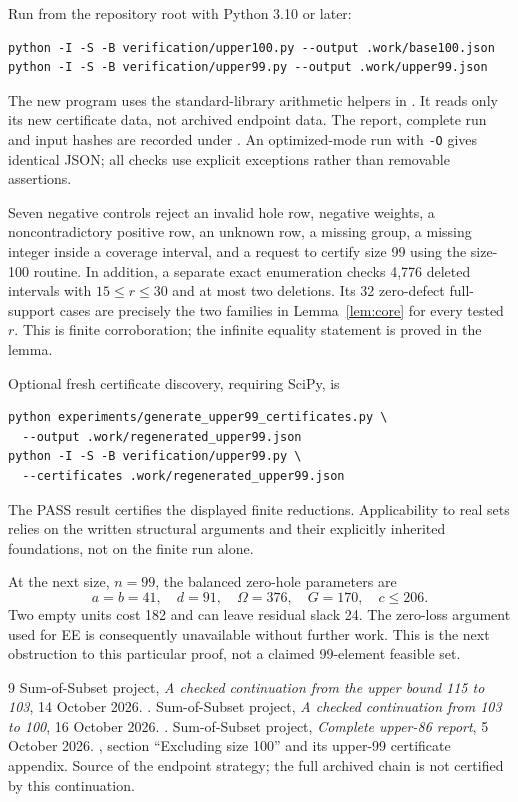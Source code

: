 \documentclass[11pt,a4paper]{article}
\begin{document}
Run from the repository root with Python 3.10 or later:
\begin{verbatim}
python -I -S -B verification/upper100.py --output .work/base100.json
python -I -S -B verification/upper99.py --output .work/upper99.json
\end{verbatim}
The new program uses the standard-library arithmetic helpers in
. It reads only its new certificate data,
not archived endpoint data. The report, complete run and input hashes
are recorded under .
An optimized-mode run with \texttt{-O} gives identical JSON; all checks
use explicit exceptions rather than removable assertions.

Seven negative controls reject an invalid hole row, negative weights,
a noncontradictory positive row, an unknown row, a missing group, a missing
integer inside a coverage interval, and a request to certify size 99
using the size-100 routine. In addition, a separate exact enumeration
checks 4,776 deleted intervals with $15\le r\le30$ and at most two
deletions. Its 32 zero-defect full-support cases are precisely the two
families in Lemma~\ref{lem:core} for every tested $r$. This is finite
corroboration; the infinite equality statement is proved in the lemma.

Optional fresh certificate discovery, requiring SciPy, is
\begin{verbatim}
python experiments/generate_upper99_certificates.py \
  --output .work/regenerated_upper99.json
python -I -S -B verification/upper99.py \
  --certificates .work/regenerated_upper99.json
\end{verbatim}
The PASS result certifies the displayed finite reductions. Applicability
to real sets relies on the written structural arguments and their
explicitly inherited foundations, not on the finite run alone.

At the next size, $n=99$, the balanced zero-hole parameters are
\[
 a=b=41,\quad d=91,\quad\Omega=376,\quad G=170,
 \quad c\le206.
\]
Two empty units cost 182 and can leave residual slack 24. The zero-loss
argument used for EE is consequently unavailable without further work.
This is the next obstruction to this particular proof, not a claimed
99-element feasible set.

\begin{thebibliography}{9}
 Sum-of-Subset project,
\emph{A checked continuation from the upper bound 115 to 103},
14 October 2026. .
\bibitem{base100} Sum-of-Subset project,
\emph{A checked continuation from 103 to 100}, 16 October 2026.
.
\bibitem{archive} Sum-of-Subset project,
\emph{Complete upper-86 report}, 5 October 2026.
, section ``Excluding size 100''
and its upper-99 certificate appendix. Source of the endpoint strategy;
the full archived chain is not certified by this continuation.
\end{thebibliography}
\end{document}

